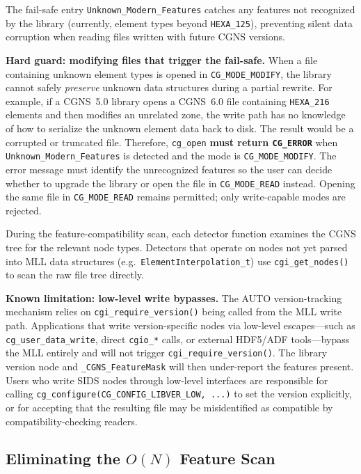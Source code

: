 \documentclass[11pt,letterpaper]{article}
\begin{document}
The fail-safe entry \texttt{Unknown\_Modern\_Features} catches any
features not recognized by the library (currently, element types
beyond \texttt{HEXA\_125}), preventing silent data corruption when
reading files written with future CGNS versions.

\textbf{Hard guard: modifying files that trigger the fail-safe.}
When a file containing unknown element types is opened in
\texttt{CG\_MODE\_MODIFY}, the library cannot safely \emph{preserve}
unknown data structures during a partial rewrite.  For example,
if a CGNS~5.0 library opens a CGNS~6.0 file containing
\texttt{HEXA\_216} elements and then modifies an unrelated zone, the
write path has no knowledge of how to serialize the unknown element
data back to disk.  The result would be a corrupted or truncated file.
Therefore, \texttt{cg\_open} \textbf{must return \texttt{CG\_ERROR}}
when \texttt{Unknown\_Modern\_Features} is detected and the mode is
\texttt{CG\_MODE\_MODIFY}.  The error message must identify the
unrecognized features so the user can decide whether to upgrade the
library or open the file in \texttt{CG\_MODE\_READ} instead.
Opening the same file in \texttt{CG\_MODE\_READ} remains permitted;
only write-capable modes are rejected.

During the feature-compatibility scan, each detector function examines
the CGNS tree for the relevant node types.  Detectors that operate on
nodes not yet parsed into MLL data structures
(e.g.\ \texttt{ElementInterpolation\_t}) use
\texttt{cgi\_get\_nodes()} to scan the raw file tree directly.

\textbf{Known limitation: low-level write bypasses.}
The AUTO version-tracking mechanism relies on \texttt{cgi\_require\_version()}
being called from the MLL write path.  Applications that write
version-specific nodes via low-level escapes---such as
\texttt{cg\_user\_data\_write}, direct \texttt{cgio\_*} calls, or
external HDF5/ADF tools---bypass the MLL entirely and will not
trigger \texttt{cgi\_require\_version()}.  The library version node
and \texttt{\_CGNS\_FeatureMask} will then under-report the features
present.  Users who write SIDS nodes through low-level interfaces are
responsible for calling \texttt{cg\_configure(CG\_CONFIG\_LIBVER\_LOW,
...)} to set the version explicitly, or for accepting that the
resulting file may be misidentified as compatible by
compatibility-checking readers.

\subsection{Eliminating the $O(N)$ Feature Scan}
\label{sec:feature-mask}
\end{document}
